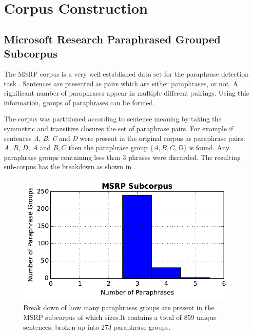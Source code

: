 \documentclass[]{book}
\begin{document}
\section{Corpus Construction}

\label{sec:Corpus-Construction}


\subsection{Microsoft Research Paraphrased Grouped Subcorpus}

The MSRP corpus is a very well established data set for the paraphrase
detection task \citep{msrParapharaCorpus}. Sentences are presented
as pairs which are either paraphrases, or not. A significant number
of paraphrases appear in multiple different pairings. Using this information,
groups of paraphrases can be formed.

The corpus was partitioned according to sentence meaning by taking
the symmetric and transitive closures the set of paraphrase pairs.
For example if sentences \emph{A},\emph{ B},\emph{ C} and \emph{D}
were present in the original corpus as paraphrase pairs: $A,\,B$,
$D,\,A$ and $B,C$ then the paraphrase group $\{A,B,C,D\}$ is found.
Any paraphrase groups containing less than 3 phrases were discarded.
The resulting sub-corpus has the breakdown as shown in .

\begin{figure}[t]
\includegraphics[width=1\columnwidth]{figs/msrp_hist}

\caption{\label{fig:msrp_corpus_hist} Break down of how many paraphrases groups
are present in the MSRP subcorpus of which sizes.It contains a total
of 859 unique sentences, broken up into 273 paraphrase groups.}
\end{figure}
\end{document}
